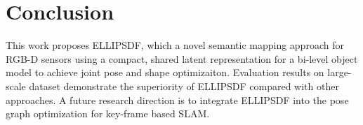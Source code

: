 \section{Conclusion}
\label{sec:conclusion}

This work proposes ELLIPSDF, which a novel semantic mapping approach for RGB-D sensors using a compact, shared latent representation for a bi-level object model to achieve joint pose and shape optimizaiton. Evaluation results on large-scale dataset demonstrate the superiority of ELLIPSDF compared with other approaches.  
A future research direction is to integrate ELLIPSDF into the pose graph optimization for key-frame based SLAM. 



